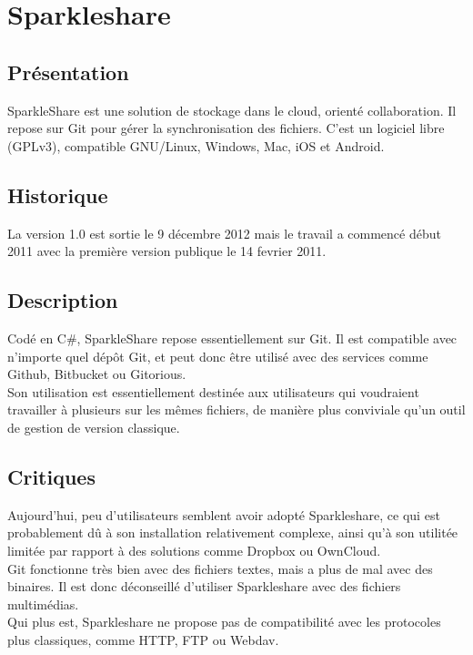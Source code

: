 \chapter{Sparkleshare}
\thispagestyle{EIP} %
\section{Présentation}
SparkleShare est une solution de stockage dans le cloud, orienté collaboration. Il repose sur Git pour gérer la synchronisation des fichiers. C'est un logiciel libre (GPLv3), compatible GNU/Linux, Windows, Mac, iOS et Android.\\

\section{Historique}
La version 1.0 est sortie le 9 décembre 2012 mais le travail a commencé début 2011 avec la première version publique le 14 fevrier 2011.\\

\section{Description}
Codé en C\#, SparkleShare repose essentiellement sur Git. Il est compatible avec n'importe quel dépôt Git, et peut donc être utilisé avec des services comme Github, Bitbucket ou Gitorious.\\

Son utilisation est essentiellement destinée aux utilisateurs qui voudraient travailler à plusieurs sur les mêmes fichiers, de manière plus conviviale qu'un outil de gestion de version classique.\\

\section{Critiques}
Aujourd'hui, peu d'utilisateurs semblent avoir adopté Sparkleshare, ce qui est probablement dû à son installation relativement complexe, ainsi qu'à son utilitée limitée par rapport à des solutions comme Dropbox ou OwnCloud.\\

Git fonctionne très bien avec des fichiers textes, mais a plus de mal avec des binaires. Il est donc déconseillé d'utiliser Sparkleshare avec des fichiers multimédias.\\
Qui plus est, Sparkleshare ne propose pas de compatibilité avec les protocoles plus classiques, comme HTTP, FTP ou Webdav.\\
